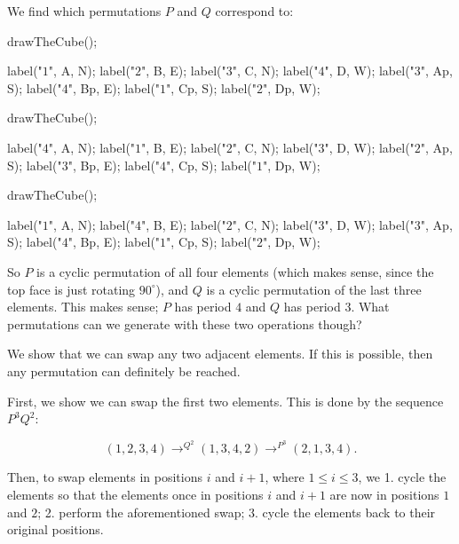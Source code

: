 \documentclass[../key.tex]{subfiles}
\begin{document}
We find which permutations $P$ and $Q$ correspond to:

\begin{minipage}{0.3\textwidth}
\begin{asy}[width=0.9\textwidth]
	drawTheCube();

	label("$1$", A, N);
	label("$2$", B, E);
	label("$3$", C, N);
	label("$4$", D, W);
	label("$3$", Ap, S);
	label("$4$", Bp, E);
	label("$1$", Cp, S);
	label("$2$", Dp, W);
\end{asy}
\end{minipage}\hfill
\begin{minipage}{0.3\textwidth}
\begin{asy}[width=0.9\textwidth]
	drawTheCube();

	label("$4$", A, N);
	label("$1$", B, E);
	label("$2$", C, N);
	label("$3$", D, W);
	label("$2$", Ap, S);
	label("$3$", Bp, E);
	label("$4$", Cp, S);
	label("$1$", Dp, W);
\end{asy}
\end{minipage}\hfill
\begin{minipage}{0.3\textwidth}
\begin{asy}[width=0.9\textwidth]
	drawTheCube();

	label("$1$", A, N);
	label("$4$", B, E);
	label("$2$", C, N);
	label("$3$", D, W);
	label("$3$", Ap, S);
	label("$4$", Bp, E);
	label("$1$", Cp, S);
	label("$2$", Dp, W);
\end{asy}
\end{minipage}

So $P$ is a cyclic permutation of all four elements (which makes sense, since the top face is just rotating $90^\circ$), and $Q$ is a cyclic permutation of the last three elements. This makes sense; $P$ has period $4$ and $Q$ has period $3$. What permutations can we generate with these two operations though?

We show that we can swap any two adjacent elements. If this is possible, then any permutation can definitely be reached.

First, we show we can swap the first two elements. This is done by the sequence $P^3Q^2$:

$$(1,2,3,4)\rightarrow^{Q^2}(1,3,4,2)\rightarrow^{P^3}(2,1,3,4).$$

Then, to swap elements in positions $i$ and $i+1$, where $1\leq i \leq 3$, we 1. cycle the elements so that the elements once in positions $i$ and $i+1$ are now in positions $1$ and $2$; 2. perform the aforementioned swap; 3. cycle the elements back to their original positions.
\end{document}
